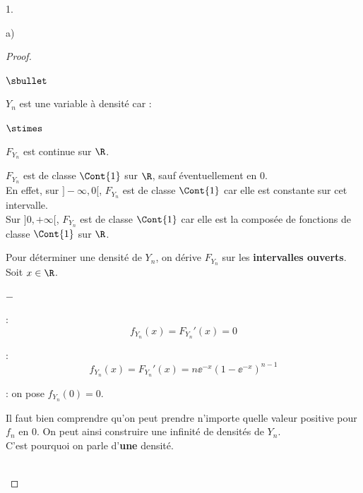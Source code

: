 \begin{noliste}{1.}
\begin{noliste}{a)}
    \begin{proof}~
      \begin{noliste}{$\sbullet$}
      \item $Y_n$ est une variable à densité car :
        \begin{noliste}{$\stimes$}
	\item $F_{Y_n}$ est continue sur $\R$.
	\item $F_{Y_n}$ est de classe $\Cont{1}$ sur $\R$, sauf
          éventuellement en $0$.\\[.2cm]
          En effet, sur $]-\infty,0[$, $F_{Y_n}$ est de classe
          $\Cont{1}$ car elle est constante sur cet intervalle.\\
          Sur $]0,+\infty[$, $F_{Y_n}$ est de classe $\Cont{1}$ car
          elle est la composée de fonctions de classe $\Cont{1}$ sur
          $\R$.
        \end{noliste}
      
      \item Pour déterminer une densité de $Y_n$, on dérive $F_{Y_n}$
        sur les {\bf intervalles ouverts}.\\
        Soit $x \in \R$. 
        \begin{noliste}{$-$}
        \item \dashuline{Si $x\in \ ]-\infty,0[$} :
          \[
          f_{Y_n}(x) = F_{Y_n}'(x) = 0
          \]
          
        \item \dashuline{Si $x\in \ ]0,+\infty[$} : 
          \[
          f_{Y_n}(x) = F_{Y_n}'(x) = n\ee^{-x}(1-\ee^{-x})^{n-1}
          \]
          
        \item {} : on pose $f_{Y_n}(0)=0$.
        \end{noliste}
      \end{noliste}
      \begin{remark}%
        Il faut bien comprendre qu'on peut prendre n'importe quelle
        valeur positive pour $f_n$ en $0$. On peut ainsi construire
        une infinité de densités de $Y_n$. \\
        C'est pourquoi on parle d'{\bf une} densité.
      \end{remark}~\\[-1.2cm]
    \end{proof}
  \end{noliste}
  

\end{noliste}
